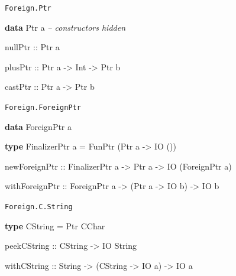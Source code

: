 \documentclass[ignorenonframetext,aspectratio=169]{beamer}
\newenvironment{Shaded}{}{}
\newcommand{\KeywordTok}[1]{\textcolor[rgb]{0.00,0.44,0.13}{\textbf{{#1}}}}
\newcommand{\DataTypeTok}[1]{\textcolor[rgb]{0.56,0.13,0.00}{{#1}}}
\newcommand{\CommentTok}[1]{\textcolor[rgb]{0.38,0.63,0.69}{\textit{{#1}}}}
\newcommand{\OtherTok}[1]{\textcolor[rgb]{0.00,0.44,0.13}{{#1}}}
\newcommand{\FunctionTok}[1]{\textcolor[rgb]{0.02,0.16,0.49}{{#1}}}
\newcommand{\NormalTok}[1]{{#1}}
\begin{document}
\begin{frame}[fragile]{\texttt{Foreign.Ptr}}

\begin{Shaded}
\begin{Highlighting}[]
\KeywordTok{data} \DataTypeTok{Ptr} \NormalTok{a      }\CommentTok{-- constructors hidden}

\OtherTok{nullPtr ::} \DataTypeTok{Ptr} \NormalTok{a}

\OtherTok{plusPtr ::} \DataTypeTok{Ptr} \NormalTok{a }\OtherTok{->} \DataTypeTok{Int} \OtherTok{->} \DataTypeTok{Ptr} \NormalTok{b}

\OtherTok{castPtr ::} \DataTypeTok{Ptr} \NormalTok{a }\OtherTok{->} \DataTypeTok{Ptr} \NormalTok{b}
\end{Highlighting}
\end{Shaded}

\end{frame}

\begin{frame}[fragile]{\texttt{Foreign.ForeignPtr}}

\begin{Shaded}
\begin{Highlighting}[]
\KeywordTok{data} \DataTypeTok{ForeignPtr} \NormalTok{a}

\KeywordTok{type} \DataTypeTok{FinalizerPtr} \NormalTok{a }\FunctionTok{=} \DataTypeTok{FunPtr} \NormalTok{(}\DataTypeTok{Ptr} \NormalTok{a }\OtherTok{->} \DataTypeTok{IO} \NormalTok{())}

\OtherTok{newForeignPtr ::} \DataTypeTok{FinalizerPtr} \NormalTok{a }\OtherTok{->} \DataTypeTok{Ptr} \NormalTok{a }\OtherTok{->} \DataTypeTok{IO} \NormalTok{(}\DataTypeTok{ForeignPtr} \NormalTok{a)}

\OtherTok{withForeignPtr ::} \DataTypeTok{ForeignPtr} \NormalTok{a }\OtherTok{->} \NormalTok{(}\DataTypeTok{Ptr} \NormalTok{a }\OtherTok{->} \DataTypeTok{IO} \NormalTok{b) }\OtherTok{->} \DataTypeTok{IO} \NormalTok{b}
\end{Highlighting}
\end{Shaded}

\end{frame}

\begin{frame}[fragile]{\texttt{Foreign.C.String}}

\begin{Shaded}
\begin{Highlighting}[]
\KeywordTok{type} \DataTypeTok{CString} \FunctionTok{=} \DataTypeTok{Ptr} \DataTypeTok{CChar}

\OtherTok{peekCString ::} \DataTypeTok{CString} \OtherTok{->} \DataTypeTok{IO} \DataTypeTok{String}

\OtherTok{withCString ::} \DataTypeTok{String} \OtherTok{->} \NormalTok{(}\DataTypeTok{CString} \OtherTok{->} \DataTypeTok{IO} \NormalTok{a) }\OtherTok{->} \DataTypeTok{IO} \NormalTok{a}
\end{Highlighting}
\end{Shaded}

\end{frame}
\end{document}
